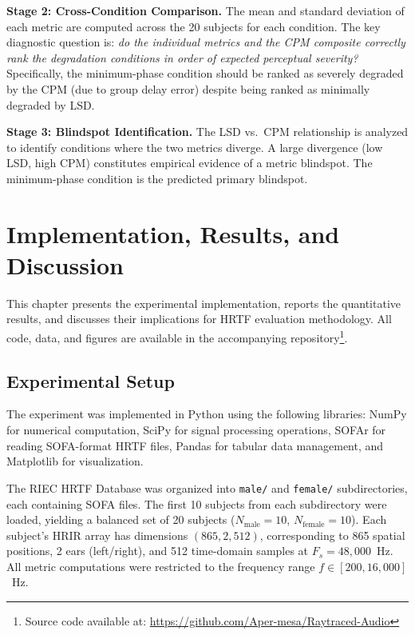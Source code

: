 \documentclass[12pt,a4paper]{article}
\begin{document}
\textbf{Stage 2: Cross-Condition Comparison.}
The mean and standard deviation of each metric are computed across the 20 subjects for each condition. The key diagnostic question is: \textit{do the individual metrics and the CPM composite correctly rank the degradation conditions in order of expected perceptual severity?} Specifically, the minimum-phase condition should be ranked as severely degraded by the CPM (due to group delay error) despite being ranked as minimally degraded by LSD.

\textbf{Stage 3: Blindspot Identification.}
The LSD vs.\ CPM relationship is analyzed to identify conditions where the two metrics diverge. A large divergence (low LSD, high CPM) constitutes empirical evidence of a metric blindspot. The minimum-phase condition is the predicted primary blindspot.



\newpage
\section{Implementation, Results, and Discussion}

This chapter presents the experimental implementation, reports the quantitative results, and discusses their implications for HRTF evaluation methodology. All code, data, and figures are available in the accompanying repository\footnote{Source code available at: \url{https://github.com/Aper-mesa/Raytraced-Audio}}.

\subsection{Experimental Setup}

The experiment was implemented in Python using the following libraries: NumPy for numerical computation, SciPy for signal processing operations, SOFAr for reading SOFA-format HRTF files, Pandas for tabular data management, and Matplotlib for visualization.

The RIEC HRTF Database \cite{watanabe2014} was organized into \texttt{male/} and \texttt{female/} subdirectories, each containing SOFA files. The first 10 subjects from each subdirectory were loaded, yielding a balanced set of 20 subjects ($N_{\mathrm{male}} = 10$, $N_{\mathrm{female}} = 10$). Each subject's HRIR array has dimensions $(865, 2, 512)$, corresponding to 865 spatial positions, 2 ears (left/right), and 512 time-domain samples at $F_s = 48{,}000$~Hz. All metric computations were restricted to the frequency range $f \in [200, 16{,}000]$~Hz.
\end{document}
